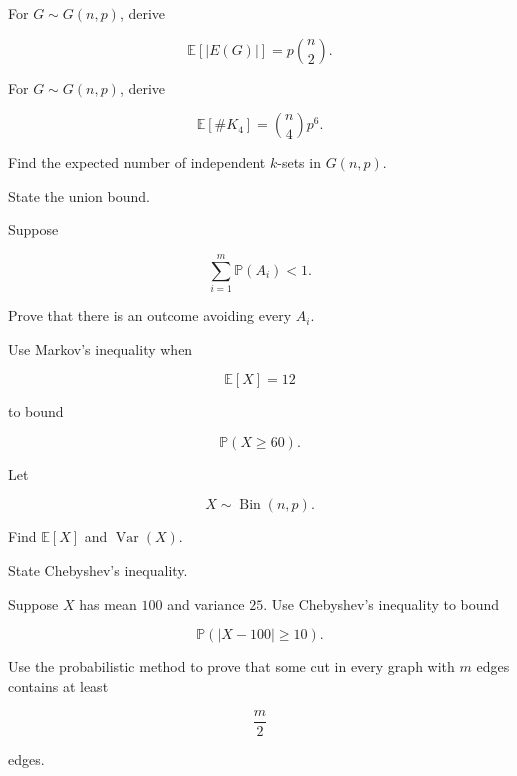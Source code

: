 \begin{exercise}[2]
For \(G\sim G(n,p)\), derive

\[
\mathbb{E}[|E(G)|]
=
p\binom n2.
\]
\end{exercise}

\begin{exercise}[2]
For \(G\sim G(n,p)\), derive

\[
\mathbb{E}[\#K_4]
=
\binom n4p^6.
\]
\end{exercise}

\begin{exercise}[2]
Find the expected number of independent \(k\)-sets in \(G(n,p)\).
\end{exercise}

\begin{exercise}[2]
State the union bound.
\end{exercise}

\begin{exercise}[2]
Suppose

\[
\sum_{i=1}^{m}\mathbb{P}(A_i)<1.
\]

Prove that there is an outcome avoiding every \(A_i\).
\end{exercise}

\begin{exercise}[2]
Use Markov's inequality when

\[
\mathbb{E}[X]=12
\]

to bound

\[
\mathbb{P}(X\geq60).
\]
\end{exercise}

\begin{exercise}[2]
Let

\[
X\sim\operatorname{Bin}(n,p).
\]

Find \(\mathbb{E}[X]\) and \(\operatorname{Var}(X)\).
\end{exercise}

\begin{exercise}[2]
State Chebyshev's inequality.
\end{exercise}

\begin{exercise}[2]
Suppose \(X\) has mean \(100\) and variance \(25\). Use Chebyshev's
inequality to bound

\[
\mathbb{P}(|X-100|\geq10).
\]
\end{exercise}

\begin{exercise}[3]
Use the probabilistic method to prove that some cut in every graph with
\(m\) edges contains at least

\[
\frac m2
\]

edges.
\end{exercise}

